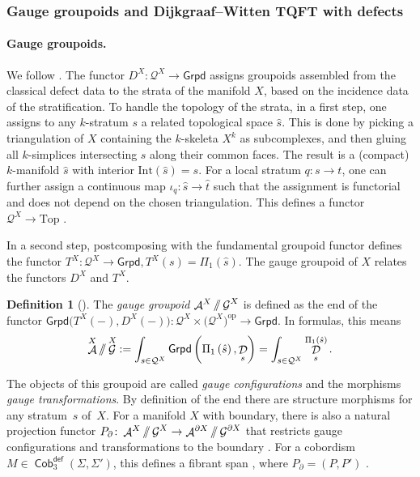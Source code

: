 \documentclass[pdftex]{sigma}
\DeclareMathOperator{\Cob}{\mathsf{Cob}}
\DeclareMathOperator{\cala}{\mathcal{A}}
\DeclareMathOperator{\cald}{\mathcal{D}}
\DeclareMathOperator{\calg}{\mathcal{G}}
\newcommand{\sslash}{\mathbin{/\mkern-6mu/}}
\numberwithin{equation}{section}
\theoremstyle{definition}
\newtheorem{Definition}[Definition]{Definition}
\begin{document}
\subsubsection{Gauge groupoids and Dijkgraaf--Witten TQFT with defects}
\label{subSecGG}
\paragraph{Gauge groupoids.} We follow \cite[Section~5]{FMM}. The functor $D^X\colon \mathcal{Q}^X \rightarrow \mathsf{Grpd}$ assigns groupoids assembled from the classical defect data to the strata of the manifold $X$, based on the incidence data of the stratification. To handle the topology of the strata, in a first step, one assigns to any $k$-stratum $s$ a related topological space $\hat{s}$. This is done by picking a triangulation of $X$ containing the $k$-skeleta $X^k$ as subcomplexes, and then gluing all $k$-simplices intersecting $s$ along their common faces. The result is a (compact) $k$-manifold $\hat{s}$ with interior $\mathrm{Int}(\hat{s}) = s$. For a local stratum $q\colon s \rightarrow t$, one can further assign a continuous map $\iota_q\colon \hat{s} \rightarrow \hat{t}$ such that the assignment is functorial and does not depend on the chosen triangulation. This defines a functor $\mathcal{Q}^X \rightarrow \mathrm{Top}$ \cite[Proposition 5.1]{FMM}.

In a second step, postcomposing with the fundamental groupoid functor defines the functor $T^X\colon \mathcal{Q}^X \rightarrow \mathsf{Grpd}, T^X(s) = \Pi_1 (\hat{s})$. The gauge groupoid of $X$ relates the functors $D^X$ and $T^X$.

\begin{Definition}[{\cite[Definition 5.7]{FMM}}]
 The \textit{gauge groupoid} $\cala^X \sslash \calg^X$ is defined as the end of the functor $\mathsf{Grpd}\bigl(T^X(-), D^X(-)\bigr)\colon \mathcal{Q}^X \times \bigl(\mathcal{Q}^X\bigr)^{\mathrm{op}} \rightarrow \mathsf{Grpd}$. In formulas, this means
 \begin{align*}
 \cala^X \sslash \calg^X := \int_{s \in \mathcal{Q}^X}\mathsf{Grpd}\left( \Pi_1\left(\hat{s}\right), \cald_s\right) = \int_{s \in \mathcal{Q}^X}\cald_s^{\Pi_1\left(\hat{s}\right)}.
 \end{align*}
\end{Definition}
The objects of this groupoid are called \textit{gauge configurations} and the morphisms \textit{gauge transformations}. By definition of the end there are structure morphisms \smash{$P_s\colon \cala^X \sslash \calg^X \rightarrow \cald_s^{\Pi_1 (\hat{s})}$} for any stratum~$s$ of~$X$. For a manifold $X$ with boundary, there is also a natural projection functor $P_{\partial}\colon \cala^X \sslash \calg^X \rightarrow \cala^{\partial X} \sslash \calg^{\partial X}$ that restricts gauge configurations and transformations to the boundary \cite[Corollary~5.8]{FMM}. For a cobordism $M \in \Cob_3^{\mathsf{def}}(\Sigma, \Sigma')$, this defines a fibrant span \smash{$\cala^{\Sigma} \sslash \calg^{\Sigma} \xleftarrow{P} \cala^M \sslash \calg^M \xrightarrow{P'} \cala^{\Sigma'} \sslash \calg^{\Sigma'}$}, where $P_{\partial} = (P, P')$ \cite[Corollary 5.13]{FMM}.
\end{document}
